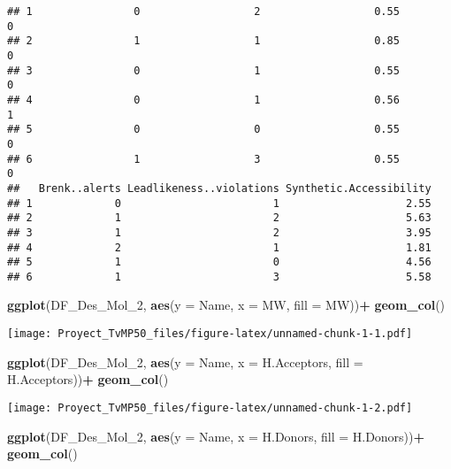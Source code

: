 \documentclass[
]{article}
\newenvironment{Shaded}{\begin{snugshade}}{\end{snugshade}}
\newcommand{\AttributeTok}[1]{\textcolor[rgb]{0.13,0.29,0.53}{#1}}
\newcommand{\FunctionTok}[1]{\textcolor[rgb]{0.13,0.29,0.53}{\textbf{#1}}}
\newcommand{\NormalTok}[1]{#1}
\newcommand{\SpecialCharTok}[1]{\textcolor[rgb]{0.81,0.36,0.00}{\textbf{#1}}}
\begin{document}
\begin{verbatim}
## 1                0                  2                  0.55             0
## 2                1                  1                  0.85             0
## 3                0                  1                  0.55             0
## 4                0                  1                  0.56             1
## 5                0                  0                  0.55             0
## 6                1                  3                  0.55             0
##   Brenk..alerts Leadlikeness..violations Synthetic.Accessibility
## 1             0                        1                    2.55
## 2             1                        2                    5.63
## 3             1                        2                    3.95
## 4             2                        1                    1.81
## 5             1                        0                    4.56
## 6             1                        3                    5.58
\end{verbatim}

\begin{Shaded}
\begin{Highlighting}[]
\FunctionTok{ggplot}\NormalTok{(DF\_Des\_Mol\_2, }\FunctionTok{aes}\NormalTok{(}\AttributeTok{y =}\NormalTok{ Name, }\AttributeTok{x =}\NormalTok{ MW, }\AttributeTok{fill =}\NormalTok{  MW))}\SpecialCharTok{+}
  \FunctionTok{geom\_col}\NormalTok{()}
\end{Highlighting}
\end{Shaded}

\texttt{[image: Proyect\_TvMP50\_files/figure-latex/unnamed-chunk-1-1.pdf]}

\begin{Shaded}
\begin{Highlighting}[]
\FunctionTok{ggplot}\NormalTok{(DF\_Des\_Mol\_2, }\FunctionTok{aes}\NormalTok{(}\AttributeTok{y =}\NormalTok{ Name, }\AttributeTok{x =}\NormalTok{ H.Acceptors, }\AttributeTok{fill =}\NormalTok{  H.Acceptors))}\SpecialCharTok{+}
  \FunctionTok{geom\_col}\NormalTok{()}
\end{Highlighting}
\end{Shaded}

\texttt{[image: Proyect\_TvMP50\_files/figure-latex/unnamed-chunk-1-2.pdf]}

\begin{Shaded}
\begin{Highlighting}[]
\FunctionTok{ggplot}\NormalTok{(DF\_Des\_Mol\_2, }\FunctionTok{aes}\NormalTok{(}\AttributeTok{y =}\NormalTok{ Name, }\AttributeTok{x =}\NormalTok{ H.Donors, }\AttributeTok{fill =}\NormalTok{  H.Donors))}\SpecialCharTok{+}
  \FunctionTok{geom\_col}\NormalTok{()}
\end{Highlighting}
\end{Shaded}
\end{document}
